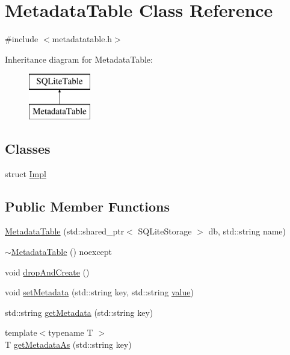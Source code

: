 \hypertarget{class_metadata_table}{}\section{Metadata\+Table Class Reference}
\label{class_metadata_table}


{\ttfamily \#include $<$metadatatable.\+h$>$}

Inheritance diagram for Metadata\+Table\+:\begin{figure}[H]
\begin{center}
\leavevmode
\includegraphics[height=2.000000cm]{db/de4/class_metadata_table}
\end{center}
\end{figure}
\subsection*{Classes}
\begin{DoxyCompactItemize}
\item 
struct \mbox{\hyperlink{struct_metadata_table_1_1_impl}{Impl}}
\end{DoxyCompactItemize}
\subsection*{Public Member Functions}
\begin{DoxyCompactItemize}
\item 
\mbox{\hyperlink{class_metadata_table_acc68db664abecdb1ec38adb6d3734a7a}{Metadata\+Table}} (std\+::shared\+\_\+ptr$<$ S\+Q\+Lite\+Storage $>$ db, std\+::string name)
\item 
\mbox{\hyperlink{class_metadata_table_ac03028aadb5b6886f708e569aabd1fac}{$\sim$\+Metadata\+Table}} () noexcept
\item 
void \mbox{\hyperlink{class_metadata_table_acb0409849ccd65c5c05f3933c84b1ec2}{drop\+And\+Create}} ()
\item 
void \mbox{\hyperlink{class_metadata_table_a0d6511046cf483b2cf951576dc5ce773}{set\+Metadata}} (std\+::string key, std\+::string \mbox{\hyperlink{diffusion_8cpp_a4b41795815d9f3d03abfc739e666d5da}{value}})
\item 
std\+::string \mbox{\hyperlink{class_metadata_table_a0e12977afc5cadd6932171d90f4eade0}{get\+Metadata}} (std\+::string key)
\item 
{\footnotesize template$<$typename T $>$ }\\T \mbox{\hyperlink{class_metadata_table_a8445f210337a939e61d732babc0672ef}{get\+Metadata\+As}} (std\+::string key)
\end{DoxyCompactItemize}


